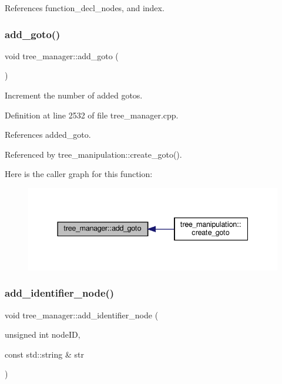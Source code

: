 References function\+\_\+decl\+\_\+nodes, and index.

\mbox{\label{classtree__manager_a0b6acab4968084ef50249e1fd6f6390d}} 
\subsubsection{\texorpdfstring{add\+\_\+goto()}{add\_goto()}}
{\footnotesize\ttfamily void tree\+\_\+manager\+::add\+\_\+goto (\begin{DoxyParamCaption}{ }\end{DoxyParamCaption})}



Increment the number of added gotos. 



Definition at line 2532 of file tree\+\_\+manager.\+cpp.



References added\+\_\+goto.



Referenced by tree\+\_\+manipulation\+::create\+\_\+goto().

Here is the caller graph for this function\+:
\nopagebreak
\begin{figure}[H]
\begin{center}
\leavevmode
\includegraphics[width=337pt]{d2/ddd/classtree__manager_a0b6acab4968084ef50249e1fd6f6390d_icgraph}
\end{center}
\end{figure}
\mbox{\label{classtree__manager_a109bce483e98aa5940917e1e84cea480}} 
\subsubsection{\texorpdfstring{add\+\_\+identifier\+\_\+node()}{add\_identifier\_node()}\hspace{0.1cm}{\footnotesize\ttfamily [1/2]}}
{\footnotesize\ttfamily void tree\+\_\+manager\+::add\+\_\+identifier\+\_\+node (\begin{DoxyParamCaption}\item[{unsigned int}]{node\+ID,  }\item[{const std\+::string \&}]{str }\end{DoxyParamCaption})\hspace{0.3cm}{\ttfamily [inline]}}



